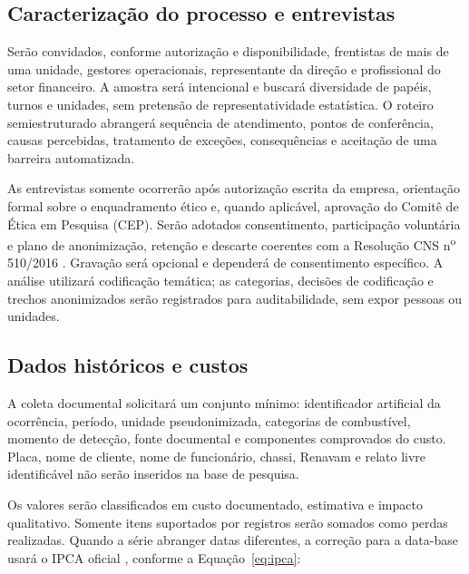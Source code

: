 \subsection{Caracterização do processo e entrevistas}

Serão convidados, conforme autorização e disponibilidade, frentistas de mais de
uma unidade, gestores operacionais, representante da direção e profissional do
setor financeiro. A amostra será intencional e buscará diversidade de papéis,
turnos e unidades, sem pretensão de representatividade estatística. O roteiro
semiestruturado abrangerá sequência de atendimento, pontos de conferência,
causas percebidas, tratamento de exceções, consequências e aceitação de uma
barreira automatizada.

As entrevistas somente ocorrerão após autorização escrita da empresa,
orientação formal sobre o enquadramento ético e, quando aplicável, aprovação do
Comitê de Ética em Pesquisa (CEP). Serão adotados consentimento, participação
voluntária e plano de anonimização, retenção e descarte coerentes com a
Resolução CNS n\textsuperscript{o} 510/2016 \cite{cns5102016}. Gravação será opcional e dependerá
de consentimento específico. A análise utilizará codificação temática; as
categorias, decisões de codificação e trechos anonimizados serão registrados
para auditabilidade, sem expor pessoas ou unidades.


\subsection{Dados históricos e custos}

A coleta documental solicitará um conjunto mínimo: identificador artificial da
ocorrência, período, unidade pseudonimizada, categorias de combustível,
momento de detecção, fonte documental e componentes comprovados do custo. Placa,
nome de cliente, nome de funcionário, chassi, Renavam e relato livre
identificável não serão inseridos na base de pesquisa.

Os valores serão classificados em custo documentado, estimativa e impacto
qualitativo. Somente itens suportados por registros serão somados como perdas
realizadas. Quando a série abranger datas diferentes, a correção para a data-base
usará o IPCA oficial \cite{ibgeIpca2026}, conforme a Equação~\ref{eq:ipca}:

